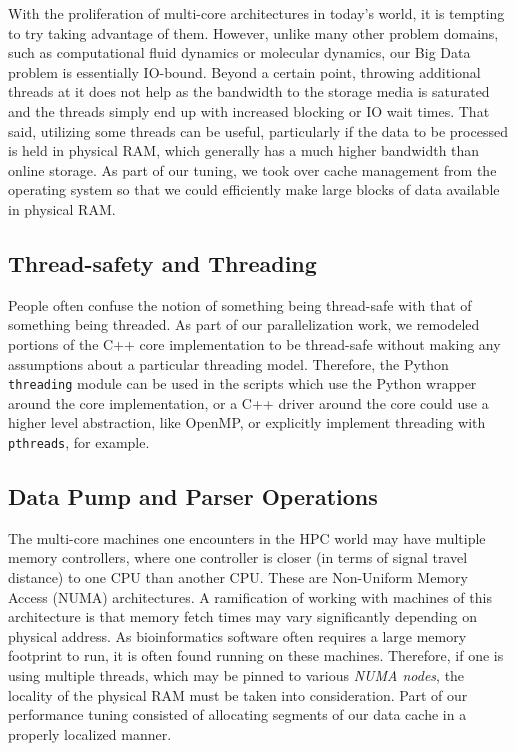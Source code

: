\documentclass{article}
\begin{document}
With the proliferation of multi-core architectures in today's world, it is tempting to try taking advantage of them. However, unlike many other problem domains, such as computational fluid dynamics or molecular dynamics, our Big Data problem is essentially IO-bound. Beyond a certain point, throwing additional threads at it does not help as the bandwidth to the storage media is saturated and the threads simply end up with increased blocking or IO wait times. That said, utilizing some threads can be useful, particularly if the data to be processed is held in physical RAM, which generally has a much higher bandwidth than online storage. As part of our tuning, we took over cache management from the operating system so that we could efficiently make large blocks of data available in physical RAM. 

\subsection{Thread-safety and Threading}

People often confuse the notion of something being thread-safe with that of something being threaded. As part of our parallelization work, we remodeled portions of the C++ core implementation to be thread-safe without making any assumptions about a particular threading model. Therefore, the Python \texttt{threading} module can be used in the scripts which use the Python wrapper around the core implementation, or a C++ driver around the core could use a higher level abstraction, like OpenMP, or explicitly implement threading with \texttt{pthreads}, for example.

\subsection{Data Pump and Parser Operations}

The multi-core machines one encounters in the HPC world may have multiple memory controllers, where one controller is closer (in terms of signal travel distance) to one CPU than another CPU. These are Non-Uniform Memory Access (NUMA) architectures. A ramification of working with machines of this architecture is that memory fetch times may vary significantly depending on physical address. As bioinformatics software often requires a large memory footprint to run, it is often found running on these machines. Therefore, if one is using multiple threads, which may be pinned to various \textit{NUMA nodes}, the locality of the physical RAM must be taken into consideration. Part of our performance tuning consisted of allocating segments of our data cache in a properly localized manner.
\end{document}
